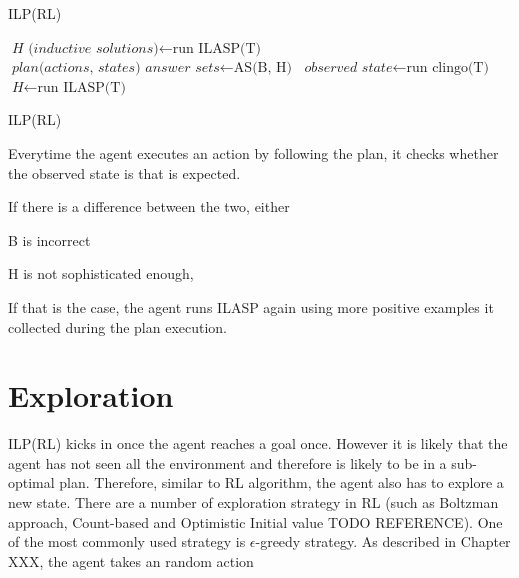 \begin{algorithm}
\caption{ILP(RL)}\label{euclid}
\begin{algorithmic}[1]


    \State $\textit{H (inductive solutions)} \gets \text{run ILASP(T)}$
    \State $\textit{plan(actions, states) answer sets} \gets \text{AS(B, H)}$
        \State $\textit{observed state} \gets \text{run clingo(T)}$
            \State $\textit{H} \gets \text{run ILASP(T)}$
            \EndIf
    \EndWhile
\EndWhile

\EndProcedure
\caption{ILP(RL) }
\end{algorithmic}
\end{algorithm}

Everytime the agent executes an action by following the plan, it checks whether the observed state is that is expected. 

If there is a difference between the two, either

B is incorrect

H is not sophisticated enough, 

If that is the case, the agent runs ILASP again using more positive examples it collected during the plan execution. 


\section{Exploration}
\label{exploration}

ILP(RL) kicks in once the agent reaches a goal once. However it is likely that the agent has not seen all the environment
and therefore is likely to be in a sub-optimal plan. Therefore, similar to RL algorithm, the agent also has to explore a new state. 
There are a number of exploration strategy in RL (such as Boltzman approach, Count-based and Optimistic Initial value TODO REFERENCE). 
One of the most commonly used strategy is $\epsilon$-greedy strategy. As described in Chapter XXX, the agent takes an random action 

